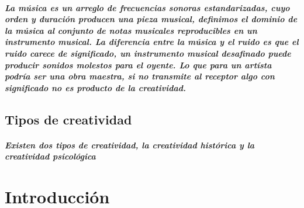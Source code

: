 \paragraph{La música es un arreglo de frecuencias sonoras estandarizadas, cuyo orden y duración producen una pieza musical, definimos el dominio de la música al conjunto de notas musicales reproducibles en un instrumento musical. La diferencia entre la música y el ruido es que el ruido carece de significado, un instrumento musical desafinado puede producir sonidos molestos para el oyente. Lo que para un artísta podría ser una obra maestra, si no transmite al receptor algo con significado no es producto de la creatividad.}

\section{Tipos de creatividad}

\paragraph{Existen dos tipos de creatividad, la creatividad histórica y la creatividad psicológica\cite{pensamiento-creativo} }


\begin{comment}
    De existir una máquina capaz de analizar el lenguaje humano, e.i. operar con todo el conocimiento humano disponible y los problemas humano, esa máquina sería capaz de proponer soluciones novedosas a los problemas humanos.
    
    ¿Es posible crear una máquina que invente un avión a partir de las leyes de la física y el requisito: volar?
\end{comment}


\chapter{Introducción}

\begin{comment}
Tesis. 1. f. Conclusión, proposición que se mantiene con razonamientos.


Creatividad.
1. f. Facultad de crear.
2. f. Capacidad de creación.

Artificial
(Del lat. artificiālis).
1. adj. Hecho por mano o arte del hombre.
2. adj. No natural, falso.
3. adj. Producido por el ingenio humano.
4. adj. ant. artificioso (disimulado, cauteloso).
\end{comment}

